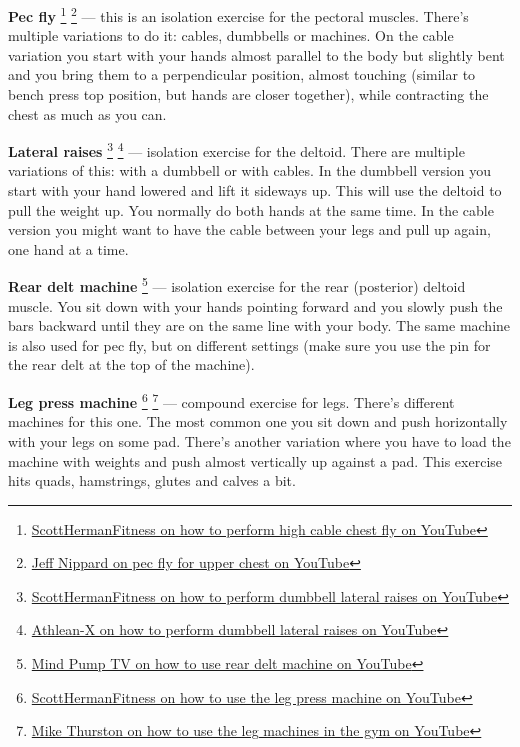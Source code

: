 \documentclass[openany, 12pt]{book}
\begin{document}
        \textbf{Pec fly}
        \footnote{\href{https://www.youtube.com/watch?v=Iwe6AmxVf7o}{ScottHermanFitness on how to perform high cable chest fly on YouTube}}
        \footnote{\href{https://www.youtube.com/watch?v=-EIhKMDSjBY}{Jeff Nippard on pec fly for upper chest on YouTube}}
        --- this is an isolation exercise for the pectoral muscles. There's multiple variations to do it: cables, dumbbells or machines.
        On the cable variation you start with your hands almost parallel to the body but slightly bent and you bring them to a perpendicular position, almost touching (similar to bench press top
        position, but hands are closer together), while contracting the chest as much as you can.

        \textbf{Lateral raises}
        \footnote{\href{https://www.youtube.com/watch?v=3VcKaXpzqRo}{ScottHermanFitness on how to perform dumbbell lateral raises on YouTube}}
        \footnote{\href{https://www.youtube.com/watch?v=q5sNYB1Q6aM}{Athlean-X on how to perform dumbbell lateral raises on YouTube}}
        ---
        isolation exercise for the deltoid. There are multiple variations of this: with a dumbbell or with cables. In the dumbbell version you start with your hand lowered and lift it sideways up.
        This will use the deltoid to pull the weight up. You normally do both hands at the same time.
        In the cable version you might want to have the cable between your legs and pull up again, one hand at a time.

        \textbf{Rear delt machine}
        \footnote{\href{https://www.youtube.com/watch?v=6yMdhi2DVao}{Mind Pump TV on how to use rear delt machine on YouTube}}
        ---
        isolation exercise for the rear (posterior) deltoid muscle. You sit down with your hands pointing forward and you slowly push the bars backward until they are on the same line with your body.
        The same machine is also used for pec fly, but on different settings (make sure you use the pin for the rear delt at the top of the machine).

        \textbf{Leg press machine}
        \footnote{\href{https://www.youtube.com/watch?v=IZxyjW7MPJQ}{ScottHermanFitness on how to use the leg press machine on YouTube}}
        \footnote{\href{https://www.youtube.com/watch?v=Uerf4Mj60Ug}{Mike Thurston on how to use the leg machines in the gym on YouTube}}
        ---
        compound exercise for legs. There's different machines for this one. The most common one you sit down and push horizontally with your legs on some pad. There's another variation where you
        have to load the machine with weights and push almost vertically up against a pad. This exercise hits quads, hamstrings, glutes and calves a bit.
\end{document}
